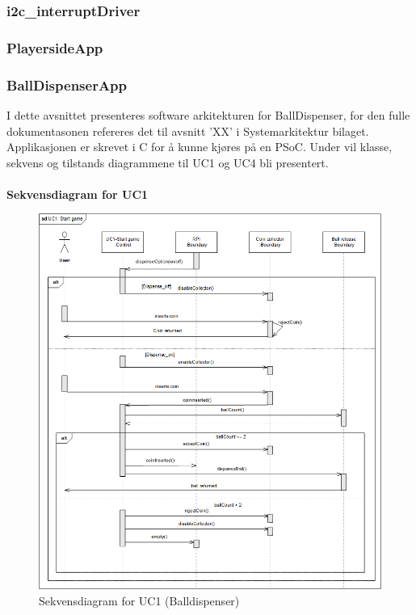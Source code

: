 \documentclass[Rapport/Rapport_main.tex]{subfiles}
\begin{document}
\subsubsection{i2c_interruptDriver}



\subsubsection{PlayersideApp}


\subsubsection{BallDispenserApp}
I dette avsnittet presenteres software arkitekturen for BallDispenser, for den fulle dokumentasonen refereres det til avsnitt 'XX' i Systemarkitektur bilaget. Applikasjonen er skrevet i C for å kunne kjøres på en PSoC. Under vil klasse, sekvens og tilstands diagrammene til UC1 og UC4 bli presentert.\\\\

\textbf{Sekvensdiagram for UC1}\\
\begin{figure}[H]
    \centering
    \includegraphics[width=\textwidth]{Arkitektur/Softwarearkitektur/Applikationsmodel/BallDispenser/graphicsBallDispenser/sdUC1.png}
    \caption{Sekvensdiagram for UC1 (Balldispenser)}
    \label{fig:BallDispScUC1}
\end{figure}
\end{document}
